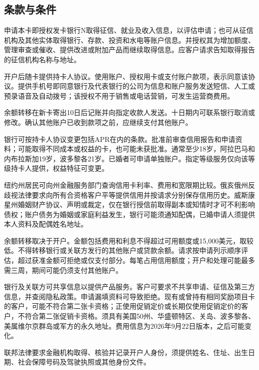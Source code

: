 \documentclass[UTF8,fontset=none,11pt,a4paper]{ctexart}
\begin{document}
\subsection*{条款与条件}
申请本卡即授权发卡银行N取得征信、就业及收入信息，以评估申请；也可从征信机构及其他实体取得银行、存款、投资和水电等账户信息。并授权其为增加额度、管理审查或催收、提供改进或附加产品而继续取得信息。应客户请求告知取得报告的征信机构名称与地址。


开户后随卡提供持卡人协议。使用账户、授权用卡或支付账户款项，表示同意该协议。提供手机号即同意银行及代表银行的公司为信息和账户服务发送短信、人工或预录语音及自动拨号；该授权不用于销售或电话营销，可发生运营商费用。


余额转移在新卡寄出10日后记账并向指定收款人发送。十日期内可联系银行取消或修改。确认其他账户已收到款项之前，应继续支付其他账户。


银行可按持卡人协议变更包括APR在内的条款。批准前审查信用报告和申请资料；可能取得不同成本或权益的卡，也可能未获批准。通常至少18岁，阿拉巴马和内布拉斯加19岁，波多黎各21岁。已婚者可申请单独账户。指定等级服务仅向该等级持卡人提供，权益特征可变更。


纽约州居民可向州金融服务部门查询信用卡利率、费用和宽限期比较。俄亥俄州反歧视法律要求向所有合资格客户平等提供信用并按请求分别保存信用历史。威斯康星州婚姻财产协议、声明或裁定，仅在银行授信前取得副本或知情时才可不利影响债权；账户债务为婚姻或家庭利益发生，银行可能须通知配偶，已婚申请人须提供本人资料及配偶姓名地址。


余额转移取决于开户。金额包括费用和利息不得超过可用额度或15,000美元，取较低。不得转移银行或关联方发行的其他账户或贷款余额。请求按申请列示顺序评估，超过获准金额可拒绝或仅支付部分。每笔占用信用额度；开户和处理可能最多需三周，期间可能仍须支付其他账户。


银行及关联方可共享信息以提供产品服务。客户可要求不共享申请、征信及第三方信息，并查阅隐私政策。申请漏填资料可导致拒绝。现有或曾持有相同奖励项目卡的客户，可能不符合第二张卡资格；正使用促销定价或长期仅使用促销定价的客户，不符合第二张促销卡资格。须具有美国50州、华盛顿特区、关岛、波多黎各、美属维尔京群岛或军方的永久地址。费用信息为2026年9月22日版本，之后可能变化。


联邦法律要求金融机构取得、核验并记录开户人身份，须提供姓名、住址、出生日期、社会保障号码及驾驶执照或其他身份文件。
\end{document}
